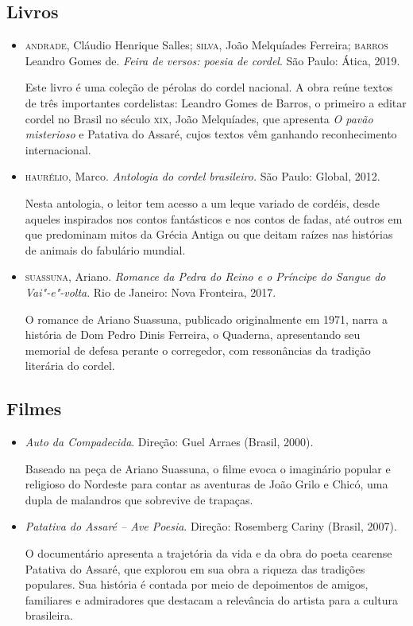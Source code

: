 \documentclass[12pt]{extarticle}
\begin{document}
\subsection{Livros}
\begin{itemize}
\item\textsc{andrade}, Cláudio Henrique Salles; \textsc{silva}, João Melquíades Ferreira; \textsc{barros} Leandro Gomes de. \textit{Feira de versos: poesia de cordel}. São Paulo: Ática, 2019.

Este livro é uma coleção de pérolas do cordel nacional. A obra reúne
textos de três importantes cordelistas: Leandro Gomes de Barros, o
primeiro a editar cordel no Brasil no século \textsc{xix}, João Melquíades, que
apresenta \emph{O pavão misterioso} e Patativa do Assaré, cujos textos
vêm ganhando reconhecimento internacional.

\item\textsc{haurélio}, Marco. \textit{Antologia do cordel brasileiro.} São Paulo:
  Global, 2012.

Nesta antologia, o leitor tem acesso a um leque variado de cordéis,
desde aqueles inspirados nos contos fantásticos e nos contos de fadas,
até outros em que predominam mitos da Grécia Antiga ou que deitam raízes
nas histórias de animais do fabulário mundial.

\item\textsc{suassuna}, Ariano. \textit{Romance da Pedra do Reino e o Príncipe do
Sangue do Vai"-e"-volta}. Rio de Janeiro: Nova Fronteira, 2017.

O romance de Ariano Suassuna, publicado originalmente em 1971, narra a
história de Dom Pedro Dinis Ferreira, o Quaderna, apresentando seu
memorial de defesa perante o corregedor, com ressonâncias da tradição
literária do cordel.
\end{itemize}

\subsection{Filmes}

\begin{itemize}
\item\textit{Auto da Compadecida}. Direção: Guel Arraes (Brasil, 2000).

Baseado na peça de Ariano Suassuna, o filme evoca o imaginário popular e
religioso do Nordeste para contar as aventuras de João Grilo e Chicó,
uma dupla de malandros que sobrevive de trapaças.

\item\textit{Patativa do Assaré -- Ave Poesia}. Direção: Rosemberg Cariny (Brasil, 2007).

O documentário apresenta a trajetória da vida e da obra do poeta
cearense Patativa do Assaré, que explorou em sua obra a riqueza das
tradições populares. Sua história é contada por meio de depoimentos de
amigos, familiares e admiradores que destacam a relevância do artista
para a cultura brasileira.
\end{itemize}
\end{document}

